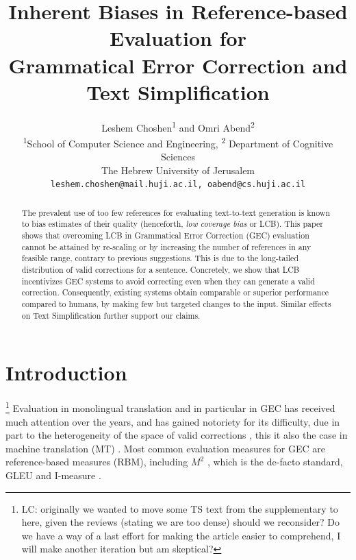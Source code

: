 \documentclass[11pt, a4paper]{article}
\newcommand{\lc}[1]{\footnote{\color{blue}LC: #1}}
\begin{document}
\title{Inherent Biases in Reference-based Evaluation for \\ Grammatical Error Correction and Text Simplification}
\author{
  Leshem Choshen\textsuperscript{1} and Omri Abend\textsuperscript{2} \\
  \textsuperscript{1}School of Computer Science and Engineering,
  \textsuperscript{2} Department of Cognitive Sciences \\
  The Hebrew University of Jerusalem \\
  \texttt{leshem.choshen@mail.huji.ac.il, oabend@cs.huji.ac.il}\\
}
\maketitle

	\begin{abstract}
		The prevalent use of too few references for evaluating text-to-text
		generation is known to bias estimates of their quality (henceforth, {\it low
		  coverage bias} or LCB). This paper shows that overcoming LCB in
		Grammatical Error Correction (GEC) evaluation cannot be attained by
		re-scaling or by increasing the number of references in any feasible
		range, contrary to previous suggestions. This is due to the long-tailed distribution of valid corrections for a sentence.
		Concretely, we show that LCB incentivizes GEC systems to avoid
    correcting even when they can generate a valid correction. 
    Consequently, existing systems obtain comparable or
		superior performance compared to humans, by making few but targeted 
		changes to the input.
		Similar effects on Text Simplification further support our claims.
	\end{abstract}

	\section{Introduction}
	
	\lc{originally we wanted to move some TS text from the supplementary to here, given the reviews (stating we are too dense) should we reconsider? Do we have a way of a last effort for making the article easier to comprehend, I will make another iteration but am skeptical?}
	Evaluation in monolingual translation \cite{xu2015problems,inderjeet2009summarization} and
	in particular in GEC
	\cite{tetreault2008native,madnani2011they,felice2015towards,bryant2015far,napoles2015ground}
	has received much attention over the years, and has gained notoriety for its difficulty,
	due in part to the heterogeneity of the space of valid corrections \cite{chodorow2012problems}, this it also the case in machine translation (MT) \cite{dreyer2012hyter}.
	Most common evaluation measures for GEC are reference-based measures (RBM), including
  $M^2$ \cite{dahlmeier2012better}, which is the de-facto standard, GLEU \cite{napoles2015ground} and I-measure \cite{felice2015towards}.
	
\end{document}
